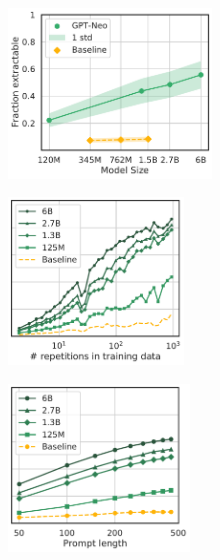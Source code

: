 \begin{figure}
\hspace{-2em}
    \centering
    \begin{subfigure}[b]{0.27\textwidth}
        \includegraphics[height=12.2em]{figures/exactly_mem-vs-model_size-prompt-all-gen-50-xlabel-ylabel.pdf} %
        \caption{}
        \label{fig:main-res-size}
    \end{subfigure}
    \hspace{4em}
    \begin{subfigure}[b]{0.27\textwidth}
        \includegraphics[height=12em]{figures/exactly_mem-vs-repetitions-mean-xlabel-markers.pdf} %
        \caption{}
        \label{fig:main-res-dups}
    \end{subfigure}
    \hspace{1.7em}
    \begin{subfigure}[b]{0.27\textwidth}
        \includegraphics[height=12em]{figures/exactly_mem-vs-prompt_len-seq-500-gen-50-xlabel-markers.pdf} %

\end{subfigure}
\end{figure}
